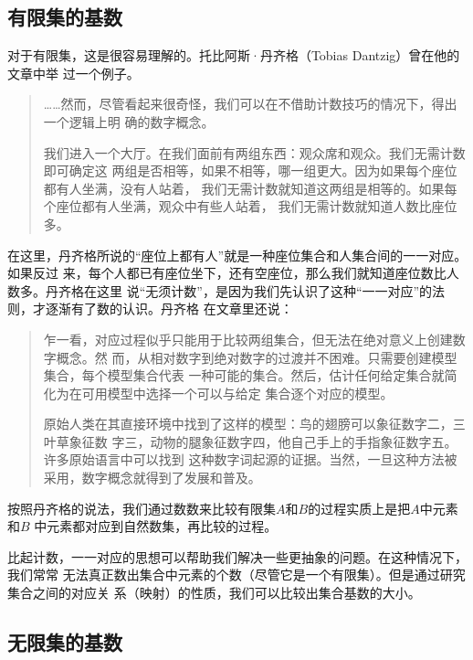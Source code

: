 \subsection{有限集的基数}

对于有限集，这是很容易理解的。托比阿斯·丹齐格（Tobias Dantzig）曾在他的文章中举
过一个例子。\cite{dantzig2007number}

\begin{quotation}
    ……然而，尽管看起来很奇怪，我们可以在不借助计数技巧的情况下，得出一个逻辑上明
    确的数字概念。

    我们进入一个大厅。在我们面前有两组东西：观众席和观众。我们无需计数即可确定这
    两组是否相等，如果不相等，哪一组更大。因为如果每个座位都有人坐满，没有人站着，
    我们无需计数就知道这两组是相等的。如果每个座位都有人坐满，观众中有些人站着，
    我们无需计数就知道人数比座位多。
\end{quotation}

在这里，丹齐格所说的“座位上都有人”就是一种座位集合和人集合间的一一对应。如果反过
来，每个人都已有座位坐下，还有空座位，那么我们就知道座位数比人数多。丹齐格在这里
说“无须计数”，是因为我们先认识了这种“一一对应”的法则，才逐渐有了数的认识。丹齐格
在文章里还说：

\begin{quotation}
    乍一看，对应过程似乎只能用于比较两组集合，但无法在绝对意义上创建数字概念。然
    而，从相对数字到绝对数字的过渡并不困难。只需要创建模型集合，每个模型集合代表
    一种可能的集合。然后，估计任何给定集合就简化为在可用模型中选择一个可以与给定
    集合逐个对应的模型。

    原始人类在其直接环境中找到了这样的模型：鸟的翅膀可以象征数字二，三叶草象征数
    字三，动物的腿象征数字四，他自己手上的手指象征数字五。许多原始语言中可以找到
    这种数字词起源的证据。当然，一旦这种方法被采用，数字概念就得到了发展和普及。
\end{quotation}

按照丹齐格的说法，我们通过数数来比较有限集$A$和$B$的过程实质上是把$A$中元素和$B$
中元素都对应到自然数集，再比较的过程。

比起计数，一一对应的思想可以帮助我们解决一些更抽象的问题。在这种情况下，我们常常
无法真正数出集合中元素的个数（尽管它是一个有限集）。但是通过研究集合之间的对应关
系（映射）的性质，我们可以比较出集合基数的大小。

\subsection{无限集的基数}

